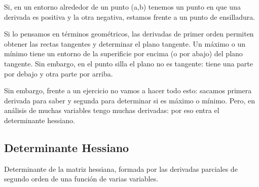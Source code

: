 Si, en un entorno alrededor de un punto (a,b)
tenemos un punto en que una derivada es positiva y la otra negativa,
estamos frente a un punto de ensilladura.

Si lo pensamos en términos geométricos, las derivadas de primer orden
permiten obtener las rectas tangentes y determinar el plano tangente.
Un máximo o un mínimo tiene un entorno de la superificie por encima (o por abajo)
del plano tangente.
Sin embargo, en el punto silla el plano no es tangente: 
tiene una parte por debajo y otra parte por arriba.

Sin embargo, frente a un ejercicio no vamos a hacer todo esto:
sacamos primera derivada para saber y segunda para determinar si es máximo o mínimo.
Pero, en análisis de muchas variables tengo muchas derivadas:
por eso entra el determinante hessiano.

\subsection{Determinante Hessiano}

Determinante de la matriz hessiana, formada por las derivadas parciales de segundo orden de una función de varias variables.

